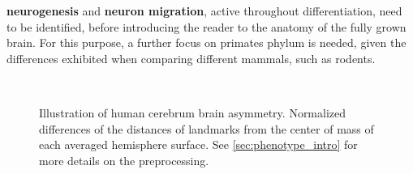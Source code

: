 \textbf{neurogenesis} and  \textbf{neuron migration}, active throughout differentiation, need to be identified, before introducing the reader to the anatomy of the fully grown brain. For this purpose, a further focus on primates phylum is needed, given the differences exhibited when comparing different mammals, such as rodents\cite{Molnar2019}.


\begin{figure}
	\centering
	\\
	\caption[Human cerebrum brain asymmetry]{Illustration of human cerebrum brain asymmetry. Normalized differences of the distances of landmarks from the center of mass of each averaged hemisphere surface. See \autoref{sec:phenotype_intro} for more details on the preprocessing.}
	\label{fig:brainlat}
\end{figure}

